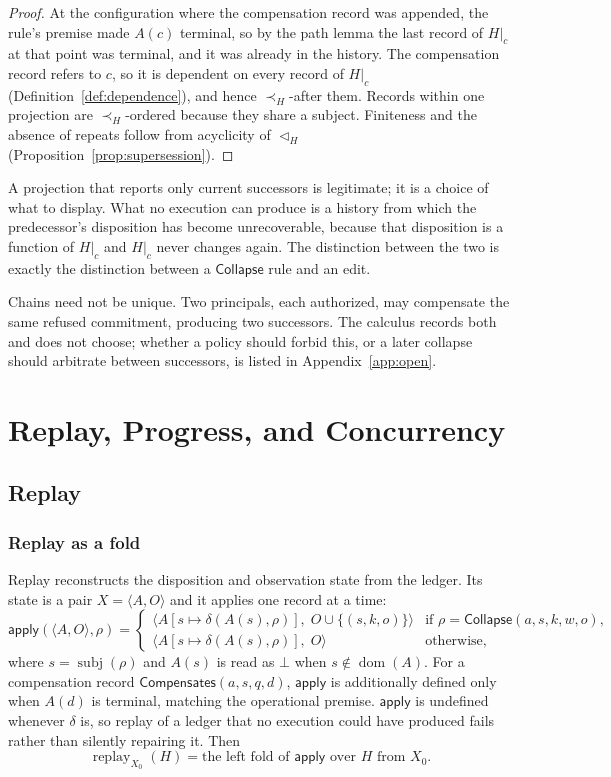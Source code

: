 \documentclass[11pt,openany]{book}
\theoremstyle{remark}
\newcommand{\Collapse}{\mathsf{Collapse}}
\newcommand{\Compensates}{\mathsf{Compensates}}
\newcommand{\dom}{\operatorname{dom}}
\newcommand{\replay}{\operatorname{replay}}
\newcommand{\subj}{\operatorname{subj}}
\begin{document}
\begin{proof}
At the configuration where the compensation record was appended, the
rule's premise made $A(c)$ terminal, so by the path lemma the last record
of $H|_c$ at that point was terminal, and it was already in the history.
The compensation record refers to $c$, so it is dependent on every record
of $H|_c$ (Definition~\ref{def:dependence}), and hence $\prec_H$-after
them. Records within one projection are $\prec_H$-ordered because they
share a subject. Finiteness and the absence of repeats follow from
acyclicity of $\triangleleft_H$ (Proposition~\ref{prop:supersession}).
\end{proof}

A projection that reports only current successors is legitimate; it is a
choice of what to display. What no execution can produce is a history from
which the predecessor's disposition has become unrecoverable, because that
disposition is a function of $H|_c$ and $H|_c$ never changes again. The
distinction between the two is exactly the distinction between a
$\Collapse$ rule and an edit.

Chains need not be unique. Two principals, each authorized, may
compensate the same refused commitment, producing two successors. The
calculus records both and does not choose; whether a policy should forbid
this, or a later collapse should arbitrate between successors, is listed
in Appendix~\ref{app:open}.

\part{Replay, Progress, and Concurrency}

\chapter{Replay}
\label{ch:replay}

\section{Replay as a fold}

Replay reconstructs the disposition and observation state from the
ledger. Its state is a pair $X=\langle A,O\rangle$ and it applies one
record at a time:
\[
\mathsf{apply}(\langle A,O\rangle,\rho)=
\begin{cases}
\langle A[s\mapsto\delta(A(s),\rho)],\;O\cup\{(s,k,o)\}\rangle
  & \text{if }\rho=\Collapse(a,s,k,w,o),\\
\langle A[s\mapsto\delta(A(s),\rho)],\;O\rangle & \text{otherwise},
\end{cases}
\]
where $s=\subj(\rho)$ and $A(s)$ is read as $\bot$ when
$s\notin\dom(A)$. For a compensation record $\Compensates(a,s,q,d)$,
$\mathsf{apply}$ is additionally defined only when $A(d)$ is terminal,
matching the operational premise. $\mathsf{apply}$ is undefined whenever
$\delta$ is, so replay of a ledger that no execution could have produced
fails rather than silently repairing it. Then
\[
\replay_{X_0}(H)=\text{the left fold of }\mathsf{apply}\text{ over }H
\text{ from }X_0.
\]
\end{document}
